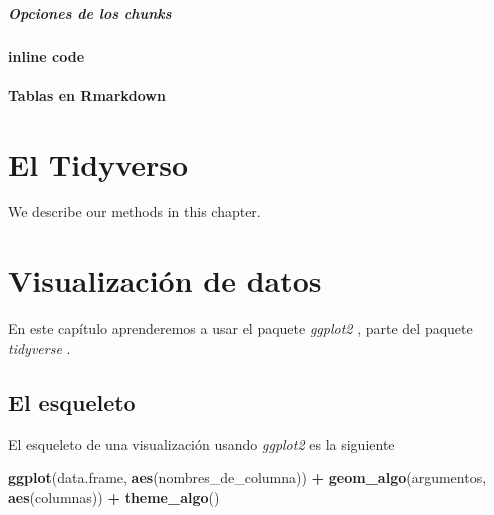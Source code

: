 \documentclass[]{book}
\newenvironment{Shaded}{\begin{snugshade}}{\end{snugshade}}
\newcommand{\KeywordTok}[1]{\textcolor[rgb]{0.13,0.29,0.53}{\textbf{#1}}}
\newcommand{\NormalTok}[1]{#1}
\newcommand{\OperatorTok}[1]{\textcolor[rgb]{0.81,0.36,0.00}{\textbf{#1}}}
\newcommand{\StringTok}[1]{\textcolor[rgb]{0.31,0.60,0.02}{#1}}
\let\oldparagraph\paragraph
\renewcommand{\paragraph}[1]{\oldparagraph{#1}\mbox{}}
\begin{document}
\hypertarget{opciones-de-los-chunks}{%
\paragraph{Opciones de los chunks}\label{opciones-de-los-chunks}}

\hypertarget{inline-code}{%
\subsubsection{inline code}\label{inline-code}}

\hypertarget{tablas-en-rmarkdown}{%
\subsubsection{Tablas en Rmarkdown}\label{tablas-en-rmarkdown}}

\hypertarget{tidyverso}{%
\chapter{El Tidyverso}\label{tidyverso}}

We describe our methods in this chapter.

\hypertarget{visualizacion}{%
\chapter{Visualización de datos}\label{visualizacion}}

En este capítulo aprenderemos a usar el paquete \emph{ggplot2}
\citep{Wickhamggplot}, parte del paquete \emph{tidyverse}
\citep{Wickhamtidyverse}.

\hypertarget{el-esqueleto}{%
\section{El esqueleto}\label{el-esqueleto}}

El esqueleto de una visualización usando \emph{ggplot2} es la siguiente

\begin{Shaded}
\begin{Highlighting}[]
\KeywordTok{ggplot}\NormalTok{(data.frame, }\KeywordTok{aes}\NormalTok{(nombres_de_columna)) }\OperatorTok{+}\StringTok{ }\KeywordTok{geom_algo}\NormalTok{(argumentos, }
    \KeywordTok{aes}\NormalTok{(columnas)) }\OperatorTok{+}\StringTok{ }\KeywordTok{theme_algo}\NormalTok{()}
\end{Highlighting}
\end{Shaded}
\end{document}
